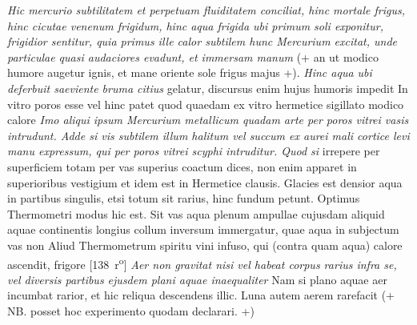 \textit{Hic mercurio subtilitatem et perpetuam fluiditatem conciliat, hinc
mortale frigus, hinc cicutae venenum\protect{} frigidum,
hinc aqua frigida ubi primum soli exponitur, frigidior sentitur,
quia primus ille calor subtilem hunc Mercurium\protect{} excitat,
unde particulae quasi audaciores evadunt, et immersam manum}
 (+ an ut modico humore augetur ignis, et mane oriente sole frigus majus +).
\textit{Hinc aqua ubi deferbuit saeviente bruma\protect{} citius} gelatur, discursus enim hujus humoris impedit  In vitro poros esse vel hinc patet quod quaedam ex vitro hermetice sigillato modico calore  \textit{Imo aliqui ipsum Mercurium metallicum quadam arte per poros vitrei vasis intrudunt. Adde si vis subtilem illum halitum vel succum ex aurei mali cortice\protect{} levi manu expressum, qui per poros vitrei scyphi intruditur. Quod si } irrepere per superficiem totam per vas superius coactum dices, non enim apparet in superioribus vestigium et idem est in Hermetice clausis.
\pend
\pstart Glacies\protect{} est densior aqua in partibus singulis, etsi totum sit rarius, hinc  fundum petunt.
\pend 
\pstart Optimus Thermometri\protect{} modus hic est. Sit vas aqua plenum ampullae cujusdam aliquid aquae continentis longius collum inversum immergatur, quae aqua in subjectum vas non  Aliud Thermometrum spiritu vini\protect{} infuso, qui (contra quam aqua) calore ascendit, frigore 
[138~r\textsuperscript{o}]
\pend%
\pstart%
%
%
%
% 
\textit{Aer non gravitat nisi vel habeat corpus rarius infra se, vel diversis partibus ejusdem plani aquae inaequaliter } Nam si plano aquae aer incumbat rarior, et  hic reliqua descendens  illic. Luna\protect{} autem aerem rarefacit (+ NB. posset hoc experimento quodam declarari. +)
